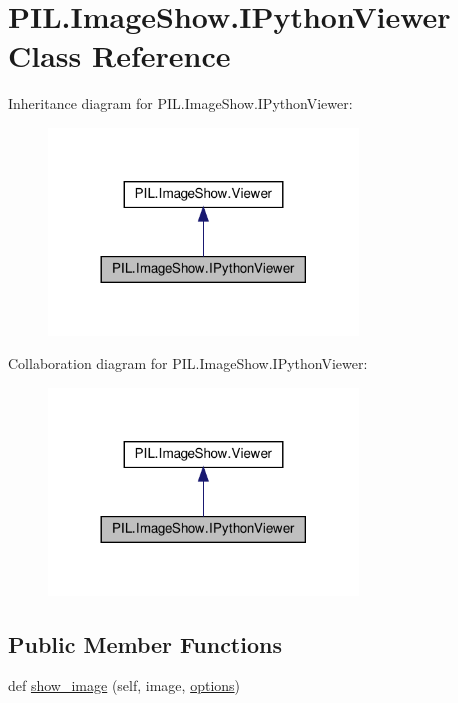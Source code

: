 \hypertarget{classPIL_1_1ImageShow_1_1IPythonViewer}{}\section{P\+I\+L.\+Image\+Show.\+I\+Python\+Viewer Class Reference}
\label{classPIL_1_1ImageShow_1_1IPythonViewer}


Inheritance diagram for P\+I\+L.\+Image\+Show.\+I\+Python\+Viewer\+:
\nopagebreak
\begin{figure}[H]
\begin{center}
\leavevmode
\includegraphics[width=233pt]{classPIL_1_1ImageShow_1_1IPythonViewer__inherit__graph}
\end{center}
\end{figure}


Collaboration diagram for P\+I\+L.\+Image\+Show.\+I\+Python\+Viewer\+:
\nopagebreak
\begin{figure}[H]
\begin{center}
\leavevmode
\includegraphics[width=233pt]{classPIL_1_1ImageShow_1_1IPythonViewer__coll__graph}
\end{center}
\end{figure}
\subsection*{Public Member Functions}
\begin{DoxyCompactItemize}
\item 
def \hyperlink{classPIL_1_1ImageShow_1_1IPythonViewer_a31b522985952ff1333b5fdd20d8fc92d}{show\+\_\+image} (self, image, \hyperlink{classPIL_1_1ImageShow_1_1Viewer_acb3726be586129f8100b5f57cd61bf97}{options})
\end{DoxyCompactItemize}
